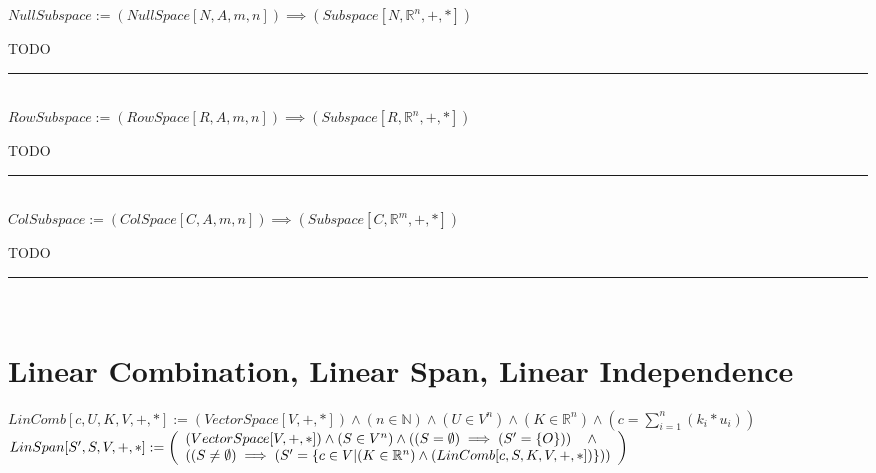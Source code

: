 \documentclass{book}
\newcommand{\abr}{:=}
\newcommand{\pr}[1]{\left(#1\right)}
\begin{document}
$NullSubspace \abr (NullSpace[N, A, m, n]) \implies (Subspace[N, \mathbb{R}^n, +, *])$
\begin{enumerate}
  \lit TODO
\end{enumerate} \vspace{.75mm} \hrule \vspace{.75mm} \ \\ 

$RowSubspace \abr (RowSpace[R, A, m, n]) \implies (Subspace[R, \mathbb{R}^n, +, *])$
\begin{enumerate}
  \lit TODO
\end{enumerate} \vspace{.75mm} \hrule \vspace{.75mm} \ \\ 

$ColSubspace \abr (ColSpace[C, A, m, n]) \implies (Subspace[C, \mathbb{R}^m, +, *])$
\begin{enumerate}
  \lit TODO
\end{enumerate} \vspace{.75mm} \hrule \vspace{.75mm} \ \\

\section{Linear Combination, Linear Span, Linear Independence}
$LinComb[c, U, K, V, +, *] \abr (VectorSpace[V, +, *]) \land (n \in \mathbb{N}) \land (U \in V^n) \land (K \in \mathbb{R}^n) \land \pr{c = \sum_{i = 1}^{n}(k_i * u_i)}$ \\
$LinSpan[S', S, V, +, *] \abr \left(\begin{array}{ll}
  (VectorSpace[V, +, *]) \land (S \in V^n) \land \pr{(S = \emptyset) \implies (S' = \{O\})} \hfill \land \hfill \\
  \pr{(S \neq \emptyset) \implies \pr{S' = \{c \in V | (K \in \mathbb{R}^n) \land (LinComb[c, S, K, V, +, *])\}}}
\end{array}\right)$ \\
\end{document}
